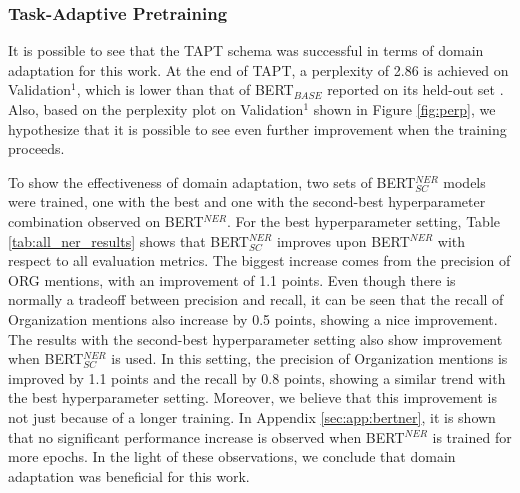 \documentclass{report}
\theoremstyle{definition}
\theoremstyle{remark}
\begin{document}
\subsubsection{Task-Adaptive Pretraining}

It is possible to see that the TAPT schema was successful in terms of domain adaptation for this work. At the end of TAPT, a perplexity of 2.86 is achieved on Validation$^1$, which is lower than that of BERT$_{BASE}$ reported on its held-out set \cite{BERT}. Also, based on the perplexity plot on Validation$^1$ shown in Figure \ref{fig:perp}, we hypothesize that it is possible to see even further improvement when the training proceeds.

To show the effectiveness of domain adaptation, two sets of BERT$^{NER}_{SC}$ models were trained, one with the best and one with the second-best hyperparameter combination observed on BERT$^{NER}$. For the best hyperparameter setting, Table \ref{tab:all_ner_results} shows that BERT$^{NER}_{SC}$ improves upon BERT$^{NER}$ with respect to all evaluation metrics. The biggest increase comes from the precision of ORG mentions, with an improvement of 1.1 points. Even though there is normally a tradeoff between precision and recall, it can be seen that the recall of Organization mentions also increase by 0.5 points, showing a nice improvement. The results with the second-best hyperparameter setting also show improvement when BERT$^{NER}_{SC}$ is used. In this setting, the precision of Organization mentions is improved by 1.1 points and the recall by 0.8 points, showing a similar trend with the best hyperparameter setting. Moreover, we believe that this improvement is not just because of a longer training. In Appendix \ref{sec:app:bertner}, it is shown that no significant performance increase is observed when BERT$^{NER}$ is trained for more epochs. In the light of these observations, we conclude that domain adaptation was beneficial for this work. 
\end{document}
